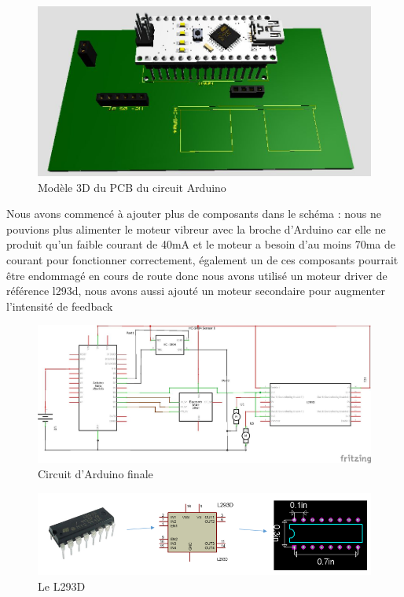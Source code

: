 \begin{figure}[!htbp]
    \centering
    \includegraphics[width=.7\textwidth]{assets/conception1/img50.jpg}
    \caption{Modèle 3D du PCB du circuit Arduino}
\end{figure}

\FloatBarrier

Nous avons commencé à ajouter plus de composants dans le schéma : nous ne pouvions plus alimenter le moteur vibreur avec la broche d’Arduino car elle ne produit qu’un faible courant de 40mA et le moteur a besoin d’au moins 70ma de courant pour fonctionner correctement, également un de ces composants pourrait être endommagé en cours de route donc nous avons utilisé un moteur driver de référence l293d, nous avons aussi ajouté un moteur secondaire pour augmenter l’intensité de feedback

\begin{figure}[!htbp]
    \centering
    \includegraphics[width=\textwidth]{assets/conception1/img54.jpg}
    \caption{Circuit d'Arduino finale}
\end{figure}

\begin{figure}[!htbp]
    \centering
    \includegraphics[width=\textwidth]{assets/conception1/3.png}
    \caption{Le L293D}
\end{figure}

